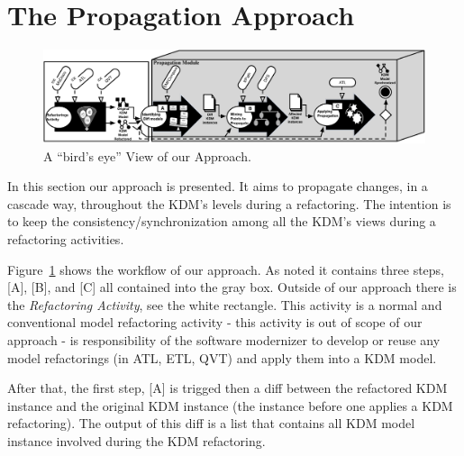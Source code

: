 %
\section{The Propagation Approach} %
\label{sec:the_approach}

\begin{figure}[t]
	\centering
	\includegraphics[scale=0.545]{figuras/PropagationModule}
	\caption{A ``bird's eye'' View of our Approach.}
	\label{fig:approach}
\end{figure}

In this section our approach is presented. It aims to propagate changes, in a cascade way, throughout the KDM's levels during a refactoring. The intention is to keep the consistency/synchronization among all the KDM's views during a refactoring activities.


%
Figure~\ref{fig:approach} shows the workflow of our approach. As noted it contains three steps, [A], [B], and [C] all contained into the gray box. Outside of our approach there is the \textit{Refactoring Activity}, see the white rectangle. This activity is a normal and conventional model refactoring activity - this activity is out of scope of our approach - is responsibility of the software modernizer to develop or reuse any model refactorings (in ATL, ETL, QVT) and apply them into a KDM model. %

After that, the first step, [A] is trigged then a diff between the refactored KDM instance and the original KDM instance (the instance before one applies a KDM refactoring). The output of this diff is a list that contains all KDM model instance involved during the KDM refactoring. %

